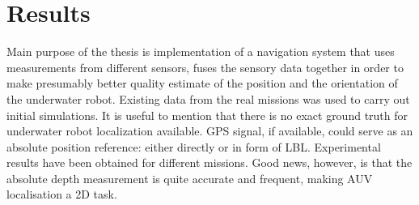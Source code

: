 \chapter{Results} \label{chap:results}
Main purpose of the thesis is implementation of a navigation system that uses measurements from different sensors, fuses the sensory data together in order to make presumably better quality estimate of the position and the orientation of the underwater robot. Existing data from the real missions was used to carry out initial simulations. It is useful to mention that there is no exact ground truth for underwater robot localization available. GPS signal, if available, could serve as an absolute position reference: either directly or in form of LBL. Experimental results have been obtained for different missions. Good news, however, is that the absolute depth measurement is quite accurate and frequent, making AUV localisation a 2D task.  



